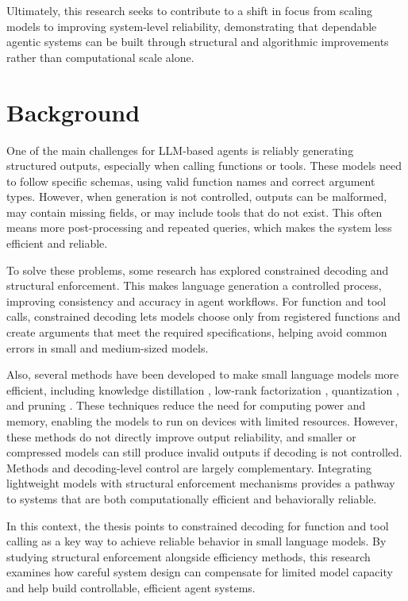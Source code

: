 \documentclass{article}
\begin{document}
Ultimately, this research seeks to contribute to a shift in focus from
scaling models to improving system-level reliability, demonstrating that
dependable agentic systems can be built through structural and algorithmic
improvements rather than computational scale alone.

\section*{Background}

One of the main challenges for LLM-based agents is reliably generating
structured outputs, especially when calling functions or tools. These models
need to follow specific schemas, using valid function names and correct
argument types. However, when generation is not controlled, outputs can be
malformed, may contain missing fields, or may include tools that do not exist.
This often means more post-processing and repeated queries, which makes the
system less efficient and reliable.

To solve these problems, some research has explored constrained decoding \cite{Geng2023Grammar-Constrained} and
structural enforcement. This makes language generation a controlled process,
improving consistency and accuracy in agent workflows. For function and tool
calls, constrained decoding lets models choose only from registered functions
and create arguments that meet the required specifications, helping avoid
common errors in small and medium-sized models.

Also, several methods have been developed to make small language models more
efficient, including knowledge distillation \cite{Hinton2015Distilling}, low-rank factorization \cite{hu2021loralowrankadaptationlarge},
quantization \cite{Liang2021Pruning}, and pruning \cite{Han2015Deep}. These techniques reduce the need for computing power
and memory, enabling the models to run on devices with limited resources.
However, these methods do not directly improve output reliability, and smaller
or compressed models can still produce invalid outputs if decoding is not
controlled. Methods and decoding-level control are largely complementary.
Integrating lightweight models with structural enforcement mechanisms provides
a pathway to systems that are both computationally efficient and behaviorally
reliable. 

In this context, the thesis points to constrained decoding for function and
tool calling as a key way to achieve reliable behavior in small language
models. By studying structural enforcement alongside efficiency methods, this
research examines how careful system design can compensate for limited model
capacity and help build controllable, efficient agent systems.
\end{document}
